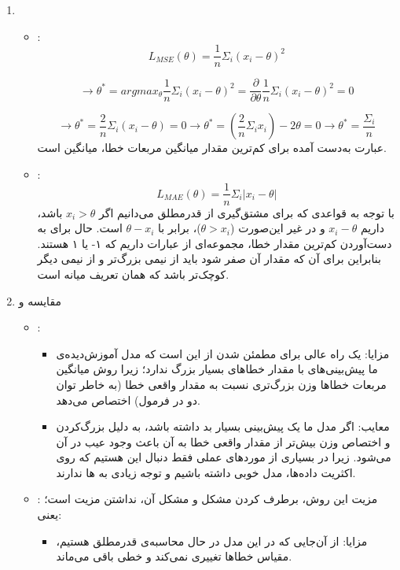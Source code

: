 
\begin{enumerate}
	\item 
	\begin{itemize}
		\item {}:
		$$
		L_{MSE}(\theta) = \frac{1}{n}\Sigma_i (x_i - \theta)^2
		$$
		
		$$
		\rightarrow \theta^* = arg max_\theta \frac{1}{n}\Sigma_i (x_i - \theta)^2 = \frac{\partial}{\partial \theta} \frac{1}{n} \Sigma_i (x_i - \theta)^2 = 0
		$$ 
		
		$$
		\rightarrow \theta^* = \frac{2}{n} \Sigma_i (x_i - \theta) = 0 \rightarrow \theta^* = (\frac{2}{n}\Sigma_i x_i) - 2  \theta = 0 
		\rightarrow \theta^* = \frac{\Sigma_i}{n}
		$$
		عبارت به‌دست آمده برای کم‌ترین مقدار میانگین مربعات خطا، میانگین است.
		
		\item {}:
		$$
			L_{MAE}(\theta) = \frac{1}{n}\Sigma_i |x_i - \theta|
		$$
		با توجه به قواعدی که برای مشتق‌گیری از قدرمطلق می‌دانیم اگر $x_i > \theta$ باشد، داریم $x_i - \theta$ و در غیر این‌صورت ($\theta > x_i$)، برابر با $\theta - x_i$ است. 
	حال برای به دست‌آوردن کم‌ترین مقدار خطا، مجموعه‌ای از عبارات داریم که ۱- یا ۱ هستند. بنابراین برای آن که مقدار آن صفر شود باید از نیمی بزرگ‌تر و از نیمی دیگر کوچک‌تر باشد که همان تعریف میانه است.
	\end{itemize}
	\item
		مقایسه  و 
	\begin{itemize}
		\item {}:
		\begin{itemize}
			\item مزایا:
				یک راه عالی برای مطمئن شدن از این است که مدل آموزش‌دیده‌ی ما پیش‌بینی‌های  با مقدار خطاهای بسیار بزرگ ندارد؛ زیرا روش میانگین مربعات خطاها وزن بزرگ‌تری نسبت به مقدار واقعی خطا (به خاطر توان دو در فرمول) اختصاص می‌دهد.
			\item معایب:
			اگر مدل ما یک پیش‌بینی بسیار بد داشته باشد، به دلیل بزرگ‌کردن و اختصاص وزن بیش‌تر از مقدار واقعی خطا به آن باعث وجود عیب در آن می‌شود. زیرا در بسیاری از موردهای عملی فقط دنبال این هستیم که روی اکثریت داده‌ها، مدل خوبی داشته باشیم و توجه زیادی به ها ندارند.
			
		\end{itemize}
	
		\item {}:
		مزیت این روش، برطرف کردن مشکل  و مشکل آن، نداشتن مزیت  است؛ یعنی:
		\begin{itemize}
			\item مزایا:
			از آن‌جایی که در این مدل در حال محاسبه‌ی قدرمطلق هستیم، مقیاس خطاها تغییری نمی‌کند و خطی باقی می‌ماند.
			

\end{itemize}
\end{itemize}
\end{enumerate}
